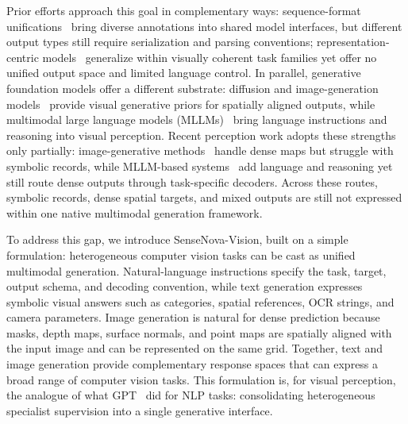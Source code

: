Prior efforts approach this goal in complementary ways: sequence-format unifications~\cite{ofa,pix2seqv2,unifiedio2} bring diverse annotations into shared model interfaces, but different output types still require serialization and parsing conventions; representation-centric models~\cite{sam,seggpt,depthanything,vggt} generalize within visually coherent task families yet offer no unified output space and limited language control.
In parallel, generative foundation models offer a different substrate: diffusion and image-generation models~\cite{ddpm,latentdiffusion} provide visual generative priors for spatially aligned outputs, while multimodal large language models (MLLMs)~\cite{flamingo,llava} bring language instructions and reasoning into visual perception.
Recent perception work adopts these strengths only partially: image-generative methods~\cite{lotus,diception,visionbanana} handle dense maps but struggle with symbolic records, while MLLM-based systems~\cite{lisa,visionllmv2,xsam} add language and reasoning yet still route dense outputs through task-specific decoders.
Across these routes, symbolic records, dense spatial targets, and mixed outputs are still not expressed within one native multimodal generation framework.

To address this gap, we introduce SenseNova-Vision, built on a simple formulation: heterogeneous computer vision tasks can be cast as unified multimodal generation.
Natural-language instructions specify the task, target, output schema, and decoding convention, while text generation expresses symbolic visual answers such as categories, spatial references, OCR strings, and camera parameters.
Image generation is natural for dense prediction because masks, depth maps, surface normals, and point maps are spatially aligned with the input image and can be represented on the same grid.
Together, text and image generation provide complementary response spaces that can express a broad range of computer vision tasks.
This formulation is, for visual perception, the analogue of what GPT~\cite{gpt3} did for NLP tasks: consolidating heterogeneous specialist supervision into a single generative interface.

